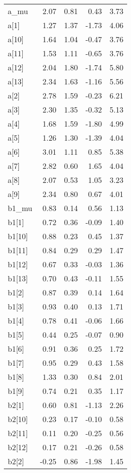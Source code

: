 \documentclass[12pt,]{article}
\begin{document}
\begin{table}[ht]
{\begin{tabular}{lrrrr}
  \hline
a\_mu & 2.07 & 0.81 & 0.43 & 3.73 \\ 
  a[1] & 1.27 & 1.37 & -1.73 & 4.06 \\ 
  a[10] & 1.64 & 1.04 & -0.47 & 3.76 \\ 
  a[11] & 1.53 & 1.11 & -0.65 & 3.76 \\ 
  a[12] & 2.04 & 1.80 & -1.74 & 5.80 \\ 
  a[13] & 2.34 & 1.63 & -1.16 & 5.56 \\ 
  a[2] & 2.78 & 1.59 & -0.23 & 6.21 \\ 
  a[3] & 2.30 & 1.35 & -0.32 & 5.13 \\ 
  a[4] & 1.68 & 1.59 & -1.80 & 4.99 \\ 
  a[5] & 1.26 & 1.30 & -1.39 & 4.04 \\ 
  a[6] & 3.01 & 1.11 & 0.85 & 5.38 \\ 
  a[7] & 2.82 & 0.60 & 1.65 & 4.04 \\ 
  a[8] & 2.07 & 0.53 & 1.05 & 3.23 \\ 
  a[9] & 2.34 & 0.80 & 0.67 & 4.01 \\ 
  b1\_mu & 0.83 & 0.14 & 0.56 & 1.13 \\ 
  b1[1] & 0.72 & 0.36 & -0.09 & 1.40 \\ 
  b1[10] & 0.88 & 0.23 & 0.45 & 1.37 \\ 
  b1[11] & 0.84 & 0.29 & 0.29 & 1.47 \\ 
  b1[12] & 0.67 & 0.33 & -0.03 & 1.36 \\ 
  b1[13] & 0.70 & 0.43 & -0.11 & 1.55 \\ 
  b1[2] & 0.87 & 0.39 & 0.14 & 1.64 \\ 
  b1[3] & 0.93 & 0.40 & 0.13 & 1.71 \\ 
  b1[4] & 0.78 & 0.41 & -0.06 & 1.66 \\ 
  b1[5] & 0.44 & 0.25 & -0.07 & 0.90 \\ 
  b1[6] & 0.91 & 0.36 & 0.25 & 1.72 \\ 
  b1[7] & 0.95 & 0.29 & 0.43 & 1.58 \\ 
  b1[8] & 1.33 & 0.30 & 0.84 & 2.01 \\ 
  b1[9] & 0.74 & 0.21 & 0.35 & 1.17 \\ 
  b2[1] & 0.60 & 0.81 & -1.13 & 2.26 \\ 
  b2[10] & 0.23 & 0.17 & -0.10 & 0.58 \\ 
  b2[11] & 0.11 & 0.20 & -0.25 & 0.56 \\ 
  b2[12] & 0.17 & 0.21 & -0.26 & 0.58 \\ 
  b2[2] & -0.25 & 0.86 & -1.98 & 1.45 \\ 

\end{tabular}}
\end{table}
\end{document}
